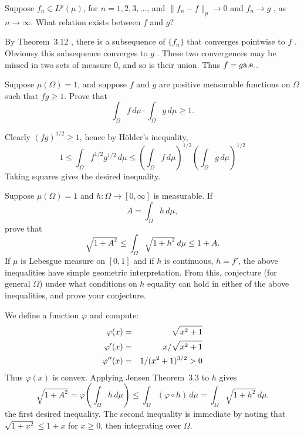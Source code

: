 \begin{enumerate}
\begin{excopy}
Suppose \(f_n\in L^p(\mu)\), for \(n=1,2,3,\ldots\), and
\(\|f_n-f\|_p\to 0\) and
\(f_n\to g\) \aded, as \(n\to \infty\).
What relation exists between $f$ and $g$?
\end{excopy}

By Theorem~3.12 \cite{RudinRCA80}, there is a subsequence of \(\{f_n\}\)
that converges pointwise to $f$ \aded. Obviousy this subsequence
converges to $g$ \aded. These two convergences may be missed
in two sets of measure $0$, and so is their union.
Thus \(f=g \textrm{a.e.}\).

\begin{excopy}
Suppose \(\mu(\Omega)=1\), and suppose $f$ and $g$ are positive measurable
functions on \(\Omega\) such that \(fg\geq 1\). Prove that
\begin{equation*}
 \int_\Omega f\,d\mu \cdot \int_\Omega g\,d\mu \geq 1.
\end{equation*}
\end{excopy}

Clearly \((fg)^{1/2} \geq 1\), hence by H\"older's inequality,
\begin{equation*}
1 \leq \int_\Omega f^{1/2} g^{1/2}\,d\mu
  \leq \left(\int_\Omega f\,d\mu\right)^{1/2}
       \left(\int_\Omega g\,d\mu\right)^{1/2}
\end{equation*}
Taking squares gives the desired inequality.


\begin{excopy}
Suppose \(\mu(\Omega)=1\) and \(h:\Omega\to[0,\infty]\) is measurable. If
\begin{equation*}
 A = \int_\Omega h\,d\mu,
\end{equation*}
prove that
\begin{equation*}
 \sqrt{1+A^2} \leq \int_\Omega \sqrt{1+h^2}\,d\mu \leq 1 + A.
\end{equation*}
If \(\mu\) is Lebesgue measure on \([0,1]\) and if $h$ is continuous, \(h=f'\),
the above inequalities have simple geometric interpretation.
From this, conjecture (for general \(\Omega\)) under what conditions on $h$
equality can hold in either of the above inequalities, and prove your
conjecture.
\end{excopy}

We define a function \(\varphi\) and compute:
\begin{eqnarray}
 \varphi(x)  &=& \sqrt{x^2+1}         \label{eq:phi:sqrt:x2} \\
 \varphi'(x) &=& x/\sqrt{x^2+1}       \notag \\
 \varphi''(x) &=& 1/(x^2+1)^{3/2} > 0 \notag
\end{eqnarray}
Thus \(\varphi(x)\) is convex. Applying Jensen Theorem~3.3 to $h$ gives
\begin{equation*}
\sqrt{1+A^2} = \varphi\left(\int_\Omega h\,d\mu\right)
 \leq \int_\Omega (\varphi \circ h)\,d\mu
 = \int_\Omega \sqrt{1+h^2}\,d\mu.
\end{equation*}
the first desired inequality. The second inequality is immediate
by noting that \(\sqrt{1+x^2}\leq 1+x\)  for \(x\geq 0\), then integrating
over \(\Omega\).


\end{enumerate}
